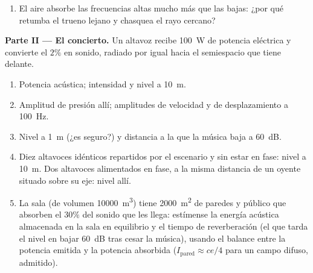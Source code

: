 \begin{problem}
\begin{enumerate}
  \item El aire absorbe las frecuencias altas mucho más que las bajas:
        ¿por qué retumba el trueno lejano y chasquea el rayo cercano?
\end{enumerate}

\medskip
\noindent\textbf{Parte II --- El concierto.}
Un altavoz recibe \qty{100}{W} de potencia eléctrica y convierte el $2\%$
en sonido, radiado por igual hacia el semiespacio que tiene delante.
\begin{enumerate}[resume]
  \item Potencia acústica; intensidad y nivel a \qty{10}{m}.
  \item Amplitud de presión allí; amplitudes de velocidad y de
        desplazamiento a \qty{100}{Hz}.
  \item Nivel a \qty{1}{m} (¿es seguro?) y distancia a la que la música
        baja a \qty{60}{dB}.
  \item Diez altavoces idénticos repartidos por el escenario y sin estar
        en fase: nivel a \qty{10}{m}. Dos altavoces alimentados en fase, a
        la misma distancia de un oyente situado sobre su eje: nivel allí.
  \item La sala (de volumen \qty{10000}{m^3}) tiene \qty{2000}{m^2} de paredes y público que absorben el $30\%$ del
        sonido que les llega: estímense la energía acústica almacenada en
        la sala en equilibrio y el tiempo de reverberación (el que tarda
        el nivel en bajar \qty{60}{dB} tras cesar la música), usando el
        balance entre la potencia emitida y la potencia absorbida
        ($I_{\text{pared}} \approx ce/4$ para un campo difuso, admitido).
\end{enumerate}


\end{problem}
